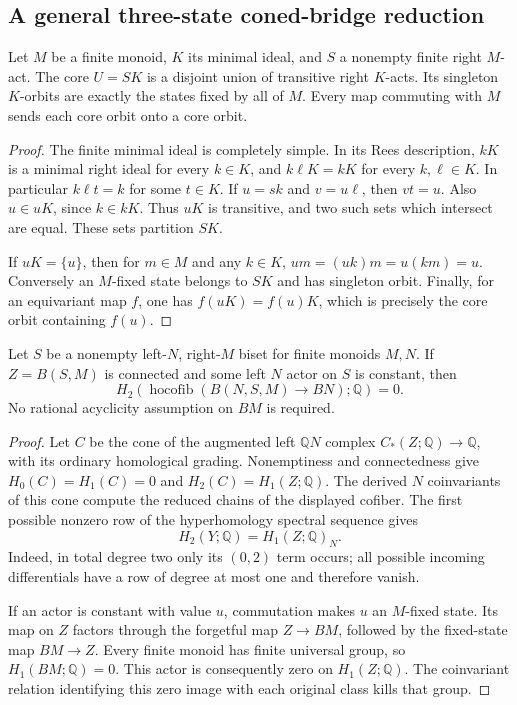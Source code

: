 \subsection{A general three-state coned-bridge reduction}

\begin{lemma}
\label{CP2:A-act-minimal-core-orbits}
Let $M$ be a finite monoid, $K$ its minimal ideal, and $S$ a
nonempty finite right $M$-act. The core $U=SK$ is a disjoint
union of transitive right $K$-acts. Its singleton $K$-orbits
are exactly the states fixed by all of $M$. Every map
commuting with $M$ sends each core orbit onto a core orbit.
\end{lemma}
\begin{proof}
The finite minimal ideal is completely simple. In its Rees
description, $kK$ is a minimal right ideal for every $k\in K$,
and $k\ell K=kK$ for every $k,\ell\in K$. In particular
$k\ell t=k$ for some $t\in K$. If $u=sk$ and $v=u\ell$,
then $vt=u$. Also $u\in uK$, since $k\in kK$.
Thus $uK$ is transitive, and two such sets which intersect
are equal. These sets partition $SK$.

If $uK=\{u\}$, then for $m\in M$ and any $k\in K$,
$um=(uk)m=u(km)=u$. Conversely an $M$-fixed state belongs
to $SK$ and has singleton orbit. Finally, for an equivariant
map $f$, one has $f(uK)=f(u)K$, which is precisely the
core orbit containing $f(u)$.
\end{proof}

\begin{lemma}
\label{CP2:A-coned-connected-constant-any-center}
Let $S$ be a nonempty left-$N$, right-$M$ biset for finite
monoids $M,N$. If $Z=B(S,M)$ is connected and some left
$N$ actor on $S$ is constant, then
\[
 H_2\!\left(\operatorname{hocofib}
   (B(N,S,M)\longrightarrow BN);\mathbb Q\right)=0.
\]
No rational acyclicity assumption on $BM$ is required.
\end{lemma}
\begin{proof}
Let $C$ be the cone of the augmented left $\mathbb QN$
complex $C_*(Z;\mathbb Q)\to\mathbb Q$, with its ordinary
homological grading. Nonemptiness and connectedness give
$H_0(C)=H_1(C)=0$ and $H_2(C)=H_1(Z;\mathbb Q)$.
The derived $N$ coinvariants of this cone compute the
reduced chains of the displayed cofiber. The first possible
nonzero row of the hyperhomology spectral sequence gives
\[
 H_2(Y;\mathbb Q)=H_1(Z;\mathbb Q)_N.
\]
Indeed, in total degree two only its $(0,2)$ term occurs;
all possible incoming differentials have a row of degree
at most one and therefore vanish.

If an actor is constant with value $u$, commutation makes
$u$ an $M$-fixed state. Its map on $Z$ factors through the
forgetful map $Z\to BM$, followed by the fixed-state map
$BM\to Z$. Every finite monoid has finite universal group,
so $H_1(BM;\mathbb Q)=0$. This actor is consequently zero
on $H_1(Z;\mathbb Q)$. The coinvariant relation identifying
this zero image with each original class kills that group.
\end{proof}

